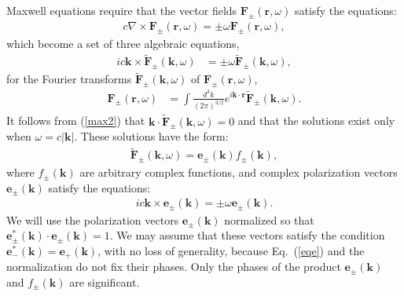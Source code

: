 \documentclass[twocolumn,aps,pra,10pt]{revtex4-1}
\begin{document}
Maxwell equations require that the vector fields ${\bm F}_\pm({\bm r},\omega)$ satisfy the equations:
\begin{align}\label{max1}
c\nabla\times{\bm F}_\pm({\bm r},\omega)=\pm\omega{\bm F}_\pm({\bm r},\omega),
\end{align}
which become a set of three algebraic equations,
\begin{align}\label{max2}
ic{\bm k}\times{\bm{\tilde{F}}}_\pm({\bm k},\omega)&=\pm\omega{\bm{\tilde{F}}}_\pm({\bm k},\omega),
\end{align}
for the Fourier transforms $\bm{\tilde{F}}_\pm({\bm k},\omega)$ of ${\bm F}_\pm({\bm r},\omega)$,
\begin{align}\label{max3}
{\bm F}_\pm({\bm r},\omega)&=\int\!\frac{d^3k}{(2\pi)^{3/2}}e^{i{{\bm k}\cdot{\bm r}}}\bm{\tilde{F}}_\pm({\bm k},\omega).
\end{align}
It follows from (\ref{max2}) that ${\bm k}\!\cdot\!{\bm{\tilde{F}}}_\pm({\bm k},\omega)=0$ and that the solutions exist only when $\omega=c|{\bm k}|$. These solutions have the form:
\begin{align}\label{fin0}
{\bm{\tilde{F}}}_\pm({\bm k},\omega)={\bm e}_\pm({\bm k})f_\pm({\bm k}),
\end{align}
where $f_\pm({\bm k})$ are arbitrary complex functions, and complex polarization vectors ${\bm e}_\pm({\bm k})$ satisfy the equations:
\begin{align}\label{eqe}
ic{\bm k}\times{\bm e}_\pm({\bm k})=\pm\omega{\bm e}_\pm({\bm k}).
\end{align}
We will use the polarization vectors ${\bm e}_\pm({\bm k})$ normalized so that ${\bm e}^*_\pm({\bm k})\cdot{\bm e}_\pm({\bm k})=1$. We may assume that these vectors satisfy the condition ${\bm e}^*_-({\bm k})={\bm e}_+({\bm k})$, with no loss of generality, because Eq.~(\ref{eqe}) and the normalization do not fix their phases. Only the phases of the product ${\bm e}_\pm({\bm k})$ and $f_\pm({\bm k})$ are significant.
\end{document}

